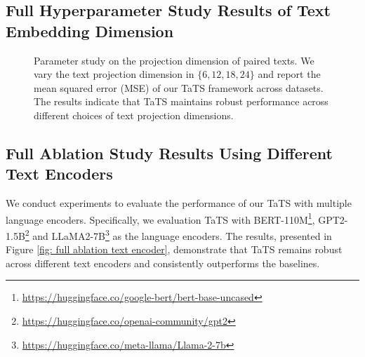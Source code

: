 \clearpage
\subsection{Full Hyperparameter Study Results of Text Embedding Dimension}
\label{ap: full hyperparameter text embedding dimension}

\begin{figure*}[h]
\centering
\vspace{-3mm}
\caption{Parameter study on the projection dimension of paired texts. We vary the text projection dimension in $\{6, 12, 18, 24\}$ and report the mean squared error (MSE) of our TaTS framework across datasets. The results indicate that TaTS maintains robust performance across different choices of text projection dimensions.}
\label{fig: full hyperparameter text embedding dimension}
\vspace{-3mm}
\end{figure*}






\clearpage
\subsection{Full Ablation Study Results Using Different Text Encoders}
\label{ap: full ablation of text encoder}
We conduct experiments to evaluate the performance of our TaTS with multiple language encoders. Specifically, we evaluation TaTS with BERT-110M\footnote{\url{https://huggingface.co/google-bert/bert-base-uncased}}, GPT2-1.5B\footnote{\url{https://huggingface.co/openai-community/gpt2}} and LLaMA2-7B\footnote{\url{https://huggingface.co/meta-llama/Llama-2-7b}} as the language encoders. The results, presented in Figure \ref{fig: full ablation text encoder}, demonstrate that TaTS remains robust across different text encoders and consistently outperforms the baselines.

